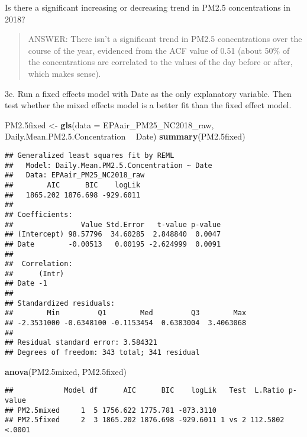 \documentclass[]{article}
\newenvironment{Shaded}{\begin{snugshade}}{\end{snugshade}}
\newcommand{\KeywordTok}[1]{\textcolor[rgb]{0.13,0.29,0.53}{\textbf{#1}}}
\newcommand{\DataTypeTok}[1]{\textcolor[rgb]{0.13,0.29,0.53}{#1}}
\newcommand{\FloatTok}[1]{\textcolor[rgb]{0.00,0.00,0.81}{#1}}
\newcommand{\StringTok}[1]{\textcolor[rgb]{0.31,0.60,0.02}{#1}}
\newcommand{\OperatorTok}[1]{\textcolor[rgb]{0.81,0.36,0.00}{\textbf{#1}}}
\newcommand{\NormalTok}[1]{#1}
\begin{document}
Is there a significant increasing or decreasing trend in PM2.5
concentrations in 2018?

\begin{quote}
ANSWER: There isn't a significant trend in PM2.5 concentrations over the
course of the year, evidenced from the ACF value of 0.51 (about 50\% of
the concentrations are correlated to the values of the day before or
after, which makes sense).
\end{quote}

3e. Run a fixed effects model with Date as the only explanatory
variable. Then test whether the mixed effects model is a better fit than
the fixed effect model.

\begin{Shaded}
\begin{Highlighting}[]
\NormalTok{PM2.5fixed <-}\StringTok{ }\KeywordTok{gls}\NormalTok{(}\DataTypeTok{data =}\NormalTok{ EPAair_PM25_NC2018_raw,}
\NormalTok{                  Daily.Mean.PM2.}\FloatTok{5.}\NormalTok{Concentration }\OperatorTok{~}\StringTok{ }\NormalTok{Date)}
\KeywordTok{summary}\NormalTok{(PM2.5fixed) }
\end{Highlighting}
\end{Shaded}

\begin{verbatim}
## Generalized least squares fit by REML
##   Model: Daily.Mean.PM2.5.Concentration ~ Date 
##   Data: EPAair_PM25_NC2018_raw 
##        AIC      BIC    logLik
##   1865.202 1876.698 -929.6011
## 
## Coefficients:
##                Value Std.Error   t-value p-value
## (Intercept) 98.57796  34.60285  2.848840  0.0047
## Date        -0.00513   0.00195 -2.624999  0.0091
## 
##  Correlation: 
##      (Intr)
## Date -1    
## 
## Standardized residuals:
##        Min         Q1        Med         Q3        Max 
## -2.3531000 -0.6348100 -0.1153454  0.6383004  3.4063068 
## 
## Residual standard error: 3.584321 
## Degrees of freedom: 343 total; 341 residual
\end{verbatim}

\begin{Shaded}
\begin{Highlighting}[]
\KeywordTok{anova}\NormalTok{(PM2.5mixed, PM2.5fixed)}
\end{Highlighting}
\end{Shaded}

\begin{verbatim}
##            Model df      AIC      BIC    logLik   Test  L.Ratio p-value
## PM2.5mixed     1  5 1756.622 1775.781 -873.3110                        
## PM2.5fixed     2  3 1865.202 1876.698 -929.6011 1 vs 2 112.5802  <.0001
\end{verbatim}
\end{document}
